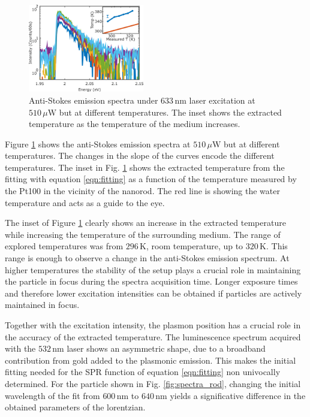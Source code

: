 \documentclass[journal=nalefd,manuscript=letter]{achemso}
\newcommand{\K}{\ensuremath{\,\textrm{K}}}
\newcommand{\nm}{\ensuremath{\,\textrm{nm}}}
\newcommand{\uW}{\ensuremath{\,\mu\textrm{W}}}
\begin{document}
\begin{figure}[htp] \centering
\includegraphics[width=0.45\textwidth]{Figures/04_Extracted_Temp/04_extracted_temp.png}
\caption{Anti-Stokes emission spectra under $633\nm$ laser excitation at
$510\uW$ but at different temperatures. The inset shows the extracted
temperature as the temperature of the medium increases.}
	\label{fig:AS-temps-rods}
\end{figure}

Figure \ref{fig:AS-temps-rods} shows the anti-Stokes emission spectra at
$510\uW$ but at different temperatures. The changes in the slope of the curves
encode the different temperatures. The inset in Fig. \ref{fig:AS-temps-rods}
shows the extracted temperature from the fitting with equation \ref{eqn:fitting}
as a function of the temperature measured by the Pt100 in the vicinity of the
nanorod. The red line is showing the water temperature and acts as a guide to
the eye.

The inset of Figure \ref{fig:AS-temps-rods} clearly shows an increase in the
extracted temperature while increasing the temperature of the surrounding
medium. The range of explored temperatures was from $296\K$, room temperature,
up to $320\K$. This range is enough to observe a change in the anti-Stokes
emission spectrum. At higher temperatures the stability of the setup
plays a crucial role in maintaining the particle in focus during the spectra
acquisition time. Longer exposure times and therefore lower excitation
intensities can be obtained if particles are actively maintained in focus.

Together with the excitation intensity, the plasmon position has a crucial role
in the accuracy of the extracted temperature. The luminescence spectrum acquired
with the $532\nm$ laser shows an asymmetric shape, due to a broadband
contribution from gold added to the plasmonic emission. This makes the initial
fitting needed for the SPR function of equation \ref{eqn:fitting} non univocally
determined. For the particle shown in Fig. \ref{fig:spectra_rod}, changing the
initial wavelength of the fit from $600\nm$ to $640\nm$ yields a significative
difference in the obtained parameters of the lorentzian.
\end{document}
